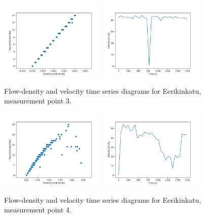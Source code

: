 \documentclass[english, 12pt, a4paper, elec, utf8, pdfa, online]{aaltothesis}
\begin{document}
\clearpage
\begin{figure}[ht!]
    \centering
    \includegraphics[width=0.45\textwidth]{graphs/Eerikinkatu_3_flw_dns.png}
    \includegraphics[width=0.45\textwidth]{graphs/Eerikinkatu_3_spd_time_6.png}
    \caption{Flow-density and velocity time series diagrams for Eerikinkatu, measurement point 3.}
\end{figure}
\begin{figure}[ht!]
    \centering
    \includegraphics[width=0.45\textwidth]{graphs/Eerikinkatu_4_flw_dns.png}
    \includegraphics[width=0.45\textwidth]{graphs/Eerikinkatu_4_spd_time_6.png}
    \caption{Flow-density and velocity time series diagrams for Eerikinkatu, measurement point 4.}
\end{figure}
\end{document}

